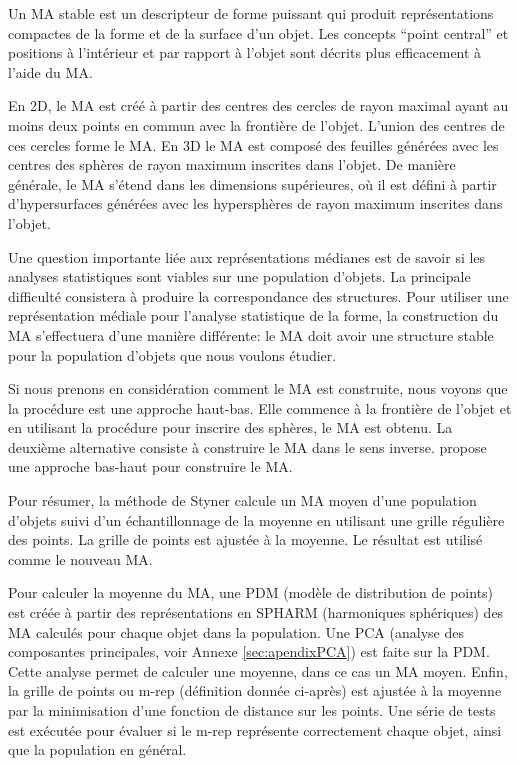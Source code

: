 Un MA stable est un descripteur de forme puissant qui produit représentations compactes de la forme et de la surface d'un objet.
Les concepts ``point central'' et positions à l'intérieur et par rapport à l'objet sont décrits plus efficacement à l'aide du MA.

En 2D, le MA est créé à partir des centres des cercles de rayon maximal ayant au moins deux points en commun avec la frontière de l'objet. L'union des centres de ces cercles forme le MA.
En 3D le MA est composé des feuilles générées avec les centres des sphères de rayon maximum inscrites dans l'objet.
De manière générale, le MA s'étend dans les dimensions supérieures, où il est défini à partir d'hypersurfaces générées avec les hypersphères de rayon maximum inscrites dans l'objet.

Une question importante liée aux représentations médianes est de savoir si les analyses statistiques sont viables sur une population d'objets.
La principale difficulté consistera à produire la correspondance des structures.
Pour utiliser une représentation médiale pour l'analyse statistique de la forme, la construction du MA s'effectuera d'une manière différente: le MA doit avoir une structure stable pour la population d'objets que nous voulons étudier.

Si nous prenons en considération comment le MA est construite, nous voyons que la procédure est une approche haut-bas. Elle commence à la frontière de l'objet et en utilisant la procédure pour inscrire des sphères, le MA est obtenu.
La deuxième alternative consiste à construire le MA dans le sens inverse.
\cite{styner2001medial} propose une approche bas-haut pour construire le MA.

Pour résumer, la méthode de Styner calcule un MA moyen d'une population d'objets suivi d'un échantillonnage de la moyenne en utilisant une grille régulière des points. 
La grille de points est ajustée à la moyenne. Le résultat est utilisé comme le nouveau MA.

Pour calculer la moyenne du MA, une PDM (modèle de distribution de points)  est créée à partir des représentations en SPHARM (harmoniques sphériques) des MA calculés pour chaque objet dans la population.
Une PCA (analyse des composantes principales, voir Annexe \ref{sec:apendixPCA}) est faite sur la PDM. Cette analyse permet de calculer une moyenne, dans ce cas un MA moyen.
Enfin, la grille de points ou m-rep (définition donnée ci-après) est ajustée à la moyenne par la minimisation d'une fonction de distance sur les points.
Une série de tests est exécutée pour évaluer si le m-rep représente correctement chaque objet, ainsi que la population en général.

